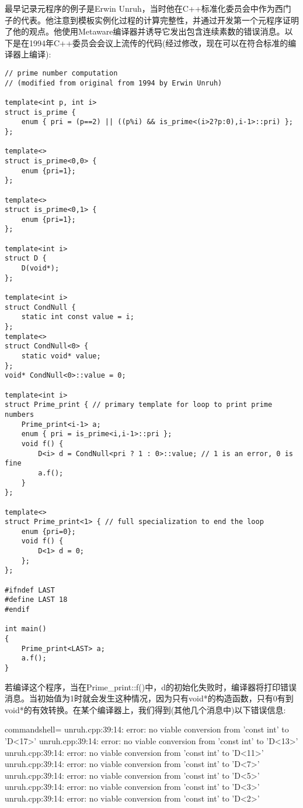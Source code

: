 最早记录元程序的例子是Erwin Unruh，当时他在C++标准化委员会中作为西门子的代表。他注意到模板实例化过程的计算完整性，并通过开发第一个元程序证明了他的观点。他使用Metaware编译器并诱导它发出包含连续素数的错误消息。以下是在1994年C++委员会会议上流传的代码(经过修改，现在可以在符合标准的编译器上编译):

\begin{lstlisting}[style=styleCXX]
// prime number computation
// (modified from original from 1994 by Erwin Unruh)

template<int p, int i>
struct is_prime {
	enum { pri = (p==2) || ((p%i) && is_prime<(i>2?p:0),i-1>::pri) };
};

template<>
struct is_prime<0,0> {
	enum {pri=1};
};

template<>
struct is_prime<0,1> {
	enum {pri=1};
};

template<int i>
struct D {
	D(void*);
};

template<int i>
struct CondNull {
	static int const value = i;
};
template<>
struct CondNull<0> {
	static void* value;
};
void* CondNull<0>::value = 0;

template<int i>
struct Prime_print { // primary template for loop to print prime numbers
	Prime_print<i-1> a;
	enum { pri = is_prime<i,i-1>::pri };
	void f() {
		D<i> d = CondNull<pri ? 1 : 0>::value; // 1 is an error, 0 is fine
		a.f();
	}
};

template<>
struct Prime_print<1> { // full specialization to end the loop
	enum {pri=0};
	void f() {
		D<1> d = 0;
	};
};

#ifndef LAST
#define LAST 18
#endif

int main()
{
	Prime_print<LAST> a;
	a.f();
}
\end{lstlisting}

若编译这个程序，当在Prime\_print::f()中，d的初始化失败时，编译器将打印错误消息。当初始值为1时就会发生这种情况，因为只有void*的构造函数，只有0有到void*的有效转换。在某个编译器上，我们得到(其他几个消息中)以下错误信息:

{\footnotesize
\begin{tcblisting}{commandshell={}}
unruh.cpp:39:14: error: no viable conversion from ’const int’ to ’D<17>’
unruh.cpp:39:14: error: no viable conversion from ’const int’ to ’D<13>’
unruh.cpp:39:14: error: no viable conversion from ’const int’ to ’D<11>’
unruh.cpp:39:14: error: no viable conversion from ’const int’ to ’D<7>’
unruh.cpp:39:14: error: no viable conversion from ’const int’ to ’D<5>’
unruh.cpp:39:14: error: no viable conversion from ’const int’ to ’D<3>’
unruh.cpp:39:14: error: no viable conversion from ’const int’ to ’D<2>’
\end{tcblisting}
}

